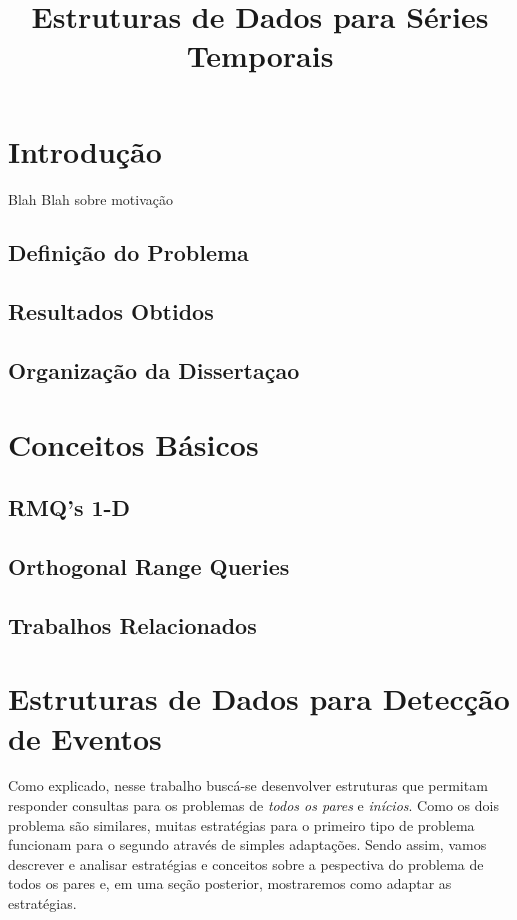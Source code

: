 \documentclass[12pt]{article}
\begin{document}
\nocite{*}

\title{Estruturas de Dados para Séries Temporais}

\maketitle

\section{Introdução}
Blah Blah sobre motivação
\subsection{Definição do Problema}
\subsection{Resultados Obtidos}
\subsection{Organização da Dissertaçao}
 
\section{Conceitos Básicos}
\subsection{RMQ's 1-D}
\subsection{Orthogonal Range Queries}
\subsection{Trabalhos Relacionados}

\section{Estruturas de Dados para Detecção de Eventos}

Como explicado, nesse trabalho buscá-se desenvolver estruturas
que permitam responder consultas para os problemas de \textit{todos os pares} e \textit{inícios}.
Como os dois problema são similares, muitas estratégias
para o primeiro tipo de problema funcionam para o segundo através
de simples adaptações. Sendo assim, vamos descrever e analisar
estratégias e conceitos sobre a pespectiva do problema de 
todos os pares e, em uma seção posterior, mostraremos como adaptar
as estratégias.
\end{document}
